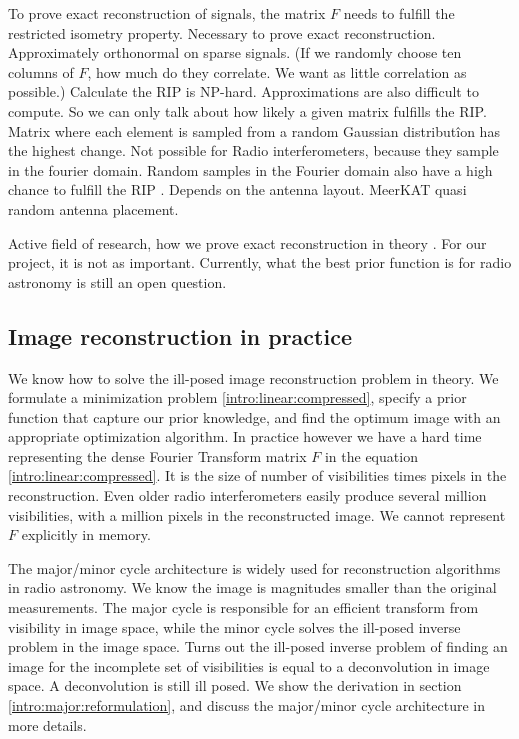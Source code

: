 To prove exact reconstruction of signals, the matrix $F$ needs to fulfill the restricted isometry property.
Necessary to prove exact reconstruction. 
Approximately orthonormal on sparse signals. (If we randomly choose ten columns of $F$, how much do they correlate. We want as little correlation as possible.)
Calculate the RIP is NP-hard\cite{tillmann2013computational}. Approximations are also difficult to compute\cite{natarajan2014computational}. 
So we can only talk about how likely a given matrix fulfills the RIP. Matrix where each element is sampled from a random Gaussian distributîon has the highest change.
Not possible for Radio interferometers, because they sample in the fourier domain.
Random samples in the Fourier domain also have a high chance to fulfill the RIP \cite{haviv2017restricted}.
Depends on the antenna layout. MeerKAT quasi random antenna placement.

Active field of research, how we prove exact reconstruction in theory \cite{candes2011probabilistic}. For our project, it is not as important. Currently, what the best prior function is for radio astronomy is still an open question. 

\subsection{Image reconstruction in practice}\label{intro:major}
We know how to solve the ill-posed image reconstruction problem in theory. We formulate a minimization problem \eqref{intro:linear:compressed}, specify a prior function that capture our prior knowledge, and find the optimum image with an appropriate optimization algorithm. In practice however we have a hard time representing the dense Fourier Transform matrix $F$ in the equation \eqref{intro:linear:compressed}. It is the size of number of visibilities times pixels in the reconstruction. Even older radio interferometers easily produce several million visibilities, with a million pixels in the reconstructed image. We cannot represent $F$ explicitly in memory. 

The major/minor cycle architecture is widely used for reconstruction algorithms in radio astronomy.
We know the image is magnitudes smaller than the original measurements. 
The major cycle is responsible for an efficient transform from visibility in image space, while the minor cycle solves the ill-posed inverse problem in the image space.
Turns out the ill-posed inverse problem of finding an image for the incomplete set of visibilities is equal to a deconvolution in image space. A deconvolution is still ill posed.  We show the derivation in section \ref{intro:major:reformulation}, and discuss the major/minor cycle architecture in more details.


